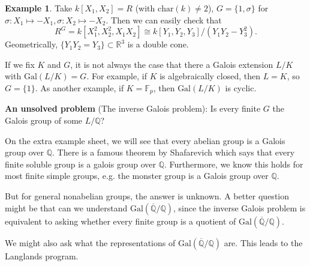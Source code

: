 \documentclass{article}
\theoremstyle{definition}
\newtheorem{example}{Example}[section]
\begin{document}
\begin{example}
    Take $k[X_1,X_2]=R$ (with $\text{char}(k)\neq2$), $G=\{1,\sigma\}$ for $\sigma: X_1 \mapsto -X_1, \sigma: X_2 \mapsto -X_2$. Then we can easily check that $$R^G = k[X_1^2,X_2^2, X_1X_2] \cong k[Y_1,Y_2,Y_3]/(Y_1Y_2-Y_3^2).$$
    Geometrically, $\{Y_1Y_2=Y_3\} \subset \mathbb{R}^3$ is a double cone.
\end{example}

If we fix $K$ and $G$, it is not always the case that there a Galois extension $L/K$ with $\text{Gal}(L/K)=G$. For example, if $K$ is algebraically closed, then $L=K$, so $G=\{1\}$. As another example, if $K=\mathbb{F}_p$, then $\text{Gal}(L/K)$ is cyclic.
\vspace{1mm}

\textbf{An unsolved problem} (The inverse Galois problem): Is every finite $G$ the Galois group of some $L/\mathbb{Q}$?
\vspace{1mm}

On the extra example sheet, we will see that every abelian group is a Galois group over $\mathbb{Q}$. There is a famous theorem by Shafarevich which says that every finite soluble group is a galois group over $\mathbb{Q}$. Furthermore, we know this holds for most finite simple groups, e.g. the monster group is a Galois group over $\mathbb{Q}$. 
\vspace{1mm}

But for general nonabelian groups, the answer is unknown. A better question might be that can we understand $\text{Gal}(\overline{\mathbb{Q}}/\mathbb{Q})$, since the inverse Galois problem is equivalent to asking whether every finite group is a quotient of $\text{Gal}(\overline{\mathbb{Q}}/\mathbb{Q})$.
\vspace{1mm}

We might also ask what the representations of $\text{Gal}(\overline{\mathbb{Q}}/\mathbb{Q})$ are. This leads to the Langlands program.
\end{document}
